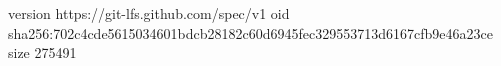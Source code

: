 version https://git-lfs.github.com/spec/v1
oid sha256:702c4cde5615034601bdcb28182c60d6945fec329553713d6167cfb9e46a23ce
size 275491

